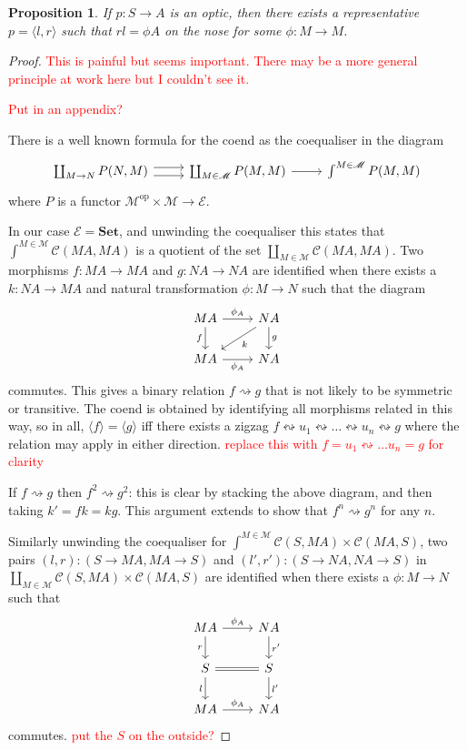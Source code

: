 \documentclass[11pt,a4paper]{article}
\theoremstyle{plain}
\newtheorem{proposition}[theorem]{Proposition}
\theoremstyle{definition}
\newcommand{\C}{\mathscr{C}}
\newcommand{\E}{\mathscr{E}}
\newcommand{\M}{\mathscr{M}}
\newcommand{\Set}{\mathbf{Set}}
\newcommand{\op}{\mathrm{op}}
\newcommand{\todo}[1]{\textcolor{red}{\small #1}}
\begin{document}
\begin{proposition}
\label{prop-onthenose}
If $p : S \to A$ is an optic, then there exists a representative $p = \langle l, r \rangle$ such that $rl = \phi A$ on the nose for some $\phi : M \to M$.
\end{proposition}
\begin{proof}
\todo{This is painful but seems important. There may be a more general principle at work here but I couldn't see it.}

\todo{Put in an appendix?}

There is a well known formula for the coend as the coequaliser in the diagram
\[
\begin{tikzcd}
\coprod_{M \to N} P(N, M) \ar[r,shift left=.75ex]  \ar[r,shift right=.75ex] & \coprod_{M \in \M} P(M, M) \ar[r] & \int^{M \in \M} P(M, M)
\end{tikzcd}
\]
where $P$ is a functor $\M^\op \times \M \to \E$.

In our case $\E = \Set$, and unwinding the coequaliser this states that $\int^{M \in \M} \C(M A, M A)$ is a quotient of the set $\coprod_{M \in \M} \C(M A, M A)$. Two morphisms $f : M A \to M A$ and $g : N A \to N A$ are identified when there exists a $k : N A \to M A$ and natural transformation $\phi : M \to N$ such that the diagram
\[
\begin{tikzcd}
M A \ar[r, "\phi_A"] \ar[d, "f", swap] & N A \ar[d, "g"] \ar[dl, "k"] \\
M A \ar[r, "\phi_A", swap] & N A
\end{tikzcd}
\]
commutes. This gives a binary relation $f \rightsquigarrow g$ that is not likely to be symmetric or transitive. The coend is obtained by identifying all morphisms related in this way, so in all, $\langle f \rangle = \langle g \rangle$ iff there exists a zigzag $f \leftrightsquigarrow u_1 \leftrightsquigarrow \dots \leftrightsquigarrow u_n \leftrightsquigarrow g$ where the relation may apply in either direction. \todo{replace this with $f = u_1 \leftrightsquigarrow \dots u_n = g$ for clarity}

If $f \rightsquigarrow g$ then $f^2 \rightsquigarrow g^2$: this is clear by stacking the above diagram, and then taking $k' = fk = kg$. This argument extends to show that $f^n \rightsquigarrow g^n$ for any $n$.

Similarly unwinding the coequaliser for $\int^{M \in \M} \C(S, M A) \times \C(M A, S)$, two pairs $(l, r) : (S \to M A, MA \to S)$ and $(l', r') : (S \to NA, NA \to S)$ in $\coprod_{M \in \M} \C(S, M A) \times \C(M A, S)$ are identified when there exists a $\phi : M \to N$ such that
\[
\begin{tikzcd}
M A \ar[r, "\phi_A"] \ar[d, "r", swap] & N A \ar[d, "r'"] \\
S \ar[r, equal] \ar[d, "l", swap] & S \ar[d, "l'"]  \\
MA \ar[r, "\phi_A"] & N A
\end{tikzcd}
\]
commutes. \todo{put the $S$ on the outside?}


\end{proof}
\end{document}
